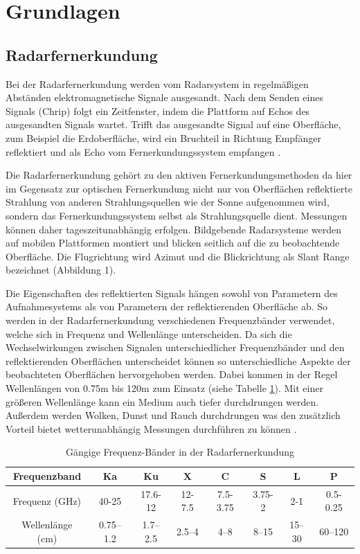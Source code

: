 \newpage
\restoregeometry
\section{Grundlagen}
\subsection{Radarfernerkundung}
Bei der Radarfernerkundung werden vom Radarsystem in regelmäßigen Abständen elektromagnetische Signale ausgesandt. Nach dem Senden eines Signals 
(Chrip) folgt ein Zeitfenster, indem die Plattform auf Echos des ausgesandten Signals wartet.
Trifft das ausgesandte Signal auf eine Oberfläche, zum Beispiel 
die Erdoberfläche, wird ein Bruchteil in Richtung Empfänger reflektiert und als Echo vom Fernerkundungssystem empfangen \cite{tutorial_on_sar}.

Die Radarfernerkundung gehört zu den aktiven Fernerkundungsmethoden da hier im Gegensatz zur optischen Fernerkundung nicht nur 
von Oberflächen reflektierte Strahlung von anderen Strahlungsquellen wie der Sonne aufgenommen wird, sondern das Fernerkundungssystem 
selbst als Strahlungsquelle dient. Messungen können daher tageszeitunabhängig erfolgen. Bildgebende Radarsysteme werden auf mobilen Plattformen 
montiert und blicken seitlich auf die zu beobachtende Oberfläche. Die Flugrichtung wird Azimut und die Blickrichtung als Slant Range 
bezeichnet \cite{tutorial_on_sar} (Abbildung 1). 

Die Eigenschaften des reflektierten Signals hängen sowohl von Parametern des Aufnahmesystems als von Parametern der reflektierenden Oberfläche ab.
So werden in der Radarfernerkundung verschiedenen Frequenzbänder verwendet, welche sich in Frequenz und Wellenlänge unterscheiden. Da sich die Wechselwirkungen zwischen Signalen 
unterschiedlicher Frequenzbänder und den reflektierenden Oberflächen unterscheidet können so unterschiedliche Aspekte der beobachteten Oberflächen hervorgehoben werden. 
Dabei kommen in der Regel Wellenlängen von 0.75m bis 120m zum Einsatz (siehe Tabelle \ref{frequenzbaender}).
Mit einer größeren Wellenlänge kann ein Medium auch tiefer durchdrungen werden. Außerdem werden Wolken, Dunst und Rauch durchdrungen was den zusätzlich Vorteil bietet
wetterunabhängig Messungen durchführen zu können \cite{einfuehrung_in_fernerkundung}.

\begin{table}[H]
    \caption{Gängige Frequenz-Bänder in der Radarfernerkundung \cite{tutorial_on_sar}}
    \centering
    \begin{tabular}{c|c c c c c c c } 
        Frequenzband & Ka & Ku & X & C & S & L & P\\ 
        \hline
        Frequenz (GHz) & 40-25 & 17.6-12 & 12-7.5 & 7.5-3.75 & 3.75-2 & 2-1 & 0.5-0.25\\ 
        Wellenlänge (cm) & 0.75–1.2 & 1.7–2.5 & 2.5–4 & 4–8 & 8–15 & 15–30 & 60–120\\ 
    \end{tabular}
    \label{frequenzbaender}
\end{table}

